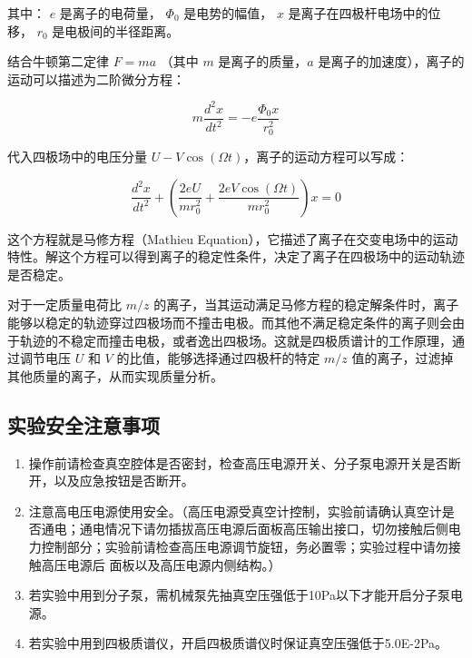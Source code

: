 \documentclass[dvipsnames, svgnames,a4paper,11pt]{article}
\begin{document}
	其中：
	 \( e \) 是离子的电荷量，
	 \( \Phi_0 \) 是电势的幅值，
	 \( x \) 是离子在四极杆电场中的位移，
	 \( r_0 \) 是电极间的半径距离。

	结合牛顿第二定律 \( F = ma \) （其中 \( m \) 是离子的质量，\( a \) 是离子的加速度），离子的运动可以描述为二阶微分方程：

	\[
	m \frac{d^2 x}{dt^2} = -e \frac{\Phi_0 x}{r_0^2}
	\]

	代入四极场中的电压分量 \( U - V \cos(\Omega t) \)，离子的运动方程可以写成：

	\[
	\frac{d^2 x}{dt^2} + \left(\frac{2eU}{mr_0^2} + \frac{2eV \cos(\Omega t)}{mr_0^2}\right) x = 0
	\]

	这个方程就是马修方程（Mathieu Equation），它描述了离子在交变电场中的运动特性。解这个方程可以得到离子的稳定性条件，决定了离子在四极场中的运动轨迹是否稳定。

	对于一定质量电荷比 \( m/z \) 的离子，当其运动满足马修方程的稳定解条件时，离子能够以稳定的轨迹穿过四极场而不撞击电极。而其他不满足稳定条件的离子则会由于轨迹的不稳定而撞击电极，或者逸出四极场。这就是四极质谱计的工作原理，通过调节电压 \( U \) 和 \( V \) 的比值，能够选择通过四极杆的特定 \( m/z \) 值的离子，过滤掉其他质量的离子，从而实现质量分析。





\subsection{实验安全注意事项}
\begin{enumerate}
	\item 操作前请检查真空腔体是否密封，检查高压电源开关、分子泵电源开关是否断开，以及应急按钮是否断开。
	\item 注意高电压电源使用安全。（高压电源受真空计控制，实验前请确认真空计是否通电；通电情况下请勿插拔高压电源后面板高压输出接口，切勿接触后侧电力控制部分；实验前请检查高压电源调节旋钮，务必置零；实验过程中请勿接触高压电源后
	面板以及高压电源内侧结构。）
	\item 若实验中用到分子泵，需机械泵先抽真空压强低于10Pa以下才能开启分子泵电源。
	\item 若实验中用到四极质谱仪，开启四极质谱仪时保证真空压强低于5.0E-2Pa。
\end{enumerate}
\end{document}
